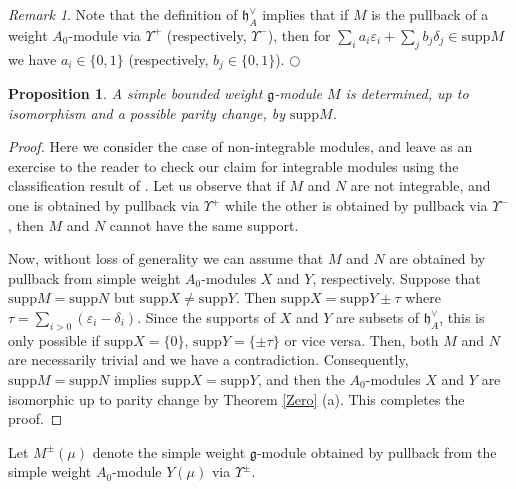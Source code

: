 \documentclass[12pt]{amsart}
\makeatletter
\def\@putname#1#2#3#4{\def\@@ref{#3}\let\old@bf\bf
        \def\bf##1{\old@bf\if?\noexpand##1?{#4}\else##1\fi}%
	#1{#2}%
        \let\bf\old@bf}
\def\@putname#1#2#3#4{\def\@@ref{#3}\let\old@bf\bf	%
	\let\old@reset@font\reset@font			%
        \def\bf##1{\old@bf\if?\noexpand##1?{#4}\else##1\fi}%
	\def\reset@font##1##2{\old@reset@font##1\if?\noexpand##2?{#4}\else##2\fi}#1{#2}%
        \let\bf\old@bf\let\reset@font\old@reset@font}
\let\my@ref=\ref
\def\ref#1{\@putname\my@ref{#1}{#1}{\tiny\rm\@@ref}}
\let\my@cite=\cite
\def\cite#1{\@putname\my@cite{#1}{\@citeb}{\tiny\rm\@@ref}}
\theoremstyle{plain} %
\numberwithin{equation}{section}
\theoremstyle{definition}
\theoremstyle{remark}
\newtheorem{remark}[definition]{Remark} %
\theoremstyle{plain} %
\newtheorem{proposition}[definition]{Proposition}
\renewcommand{\gg}{\mathfrak{g}}
\newcommand{\supp}{\mathrm{supp}}
\newcommand{\gh}{\mathfrak{h}}
\def\gg{\mathfrak{g}}
\def\gh{\mathfrak{h}}
\makeatother
\begin{document}
          \begin{remark} \label{rem-theta} Note that the definition of $\gh_A^{\vee}$ implies that if $M$ is the pullback of a weight $A_0$-module via $\Upsilon^+$ (respectively,  $\Upsilon^-$), then for $\sum_i a_i \varepsilon_i + \sum_j b_j \delta_j  \in \supp M$ we have $a_i \in \{ 0,1\}$  (respectively,  $b_j \in \{ 0,1\}$).
                   \hfill${\bigcirc}$    \end{remark}
     
      \begin{proposition}\label{supportisom} A simple bounded weight $\gg$-module $M$ is determined, up to isomorphism and a
        possible parity change, by $\supp M$.
      \end{proposition}
      \begin{proof} Here we consider the case of non-integrable modules, and leave as an exercise to the reader to check our claim for integrable modules using the classification result 
      of \cite{CP}.
        Let us observe  that if $M$ and $N$ are not integrable, and one is obtained by pullback via $\Upsilon^+$ while the other is obtained by pullback via $\Upsilon^-$, then $M$ and $N$ cannot  have the same support.

Now, without loss of generality we can assume that $M$ and $N$ are obtained by pullback from simple weight $A_0$-modules $X$ and $Y$, respectively.
        Suppose that $\supp M=\supp N$ but $\supp X\neq\supp Y$. Then $\supp X=\supp Y\pm\tau$ where $\tau= \sum_{i>0}(\varepsilon_i-\delta_i)$.
        Since the supports of $X$ and $Y$ are subsets of $\gh_A^\vee$, this is only possible  if  $\supp X=\{0\}$, $\supp Y=\{\pm \tau\}$ or vice versa.
        Then, both $M$ and $N$ are necessarily trivial and we have a contradiction. Consequently, $\supp M=\supp N$ implies $\supp X=\supp Y$, and then the     $A_0$-modules $X$ and $Y$ are isomorphic up to parity change
     by Theorem \ref{Zero}(a). This completes the proof.
   \end{proof}
   
             
          Let $M^\pm(\mu)$ denote the simple weight $\gg$-module obtained by pullback from  the simple  weight $A_0$-module $Y(\mu)$ via $\Upsilon^\pm$.
          
\end{document}
